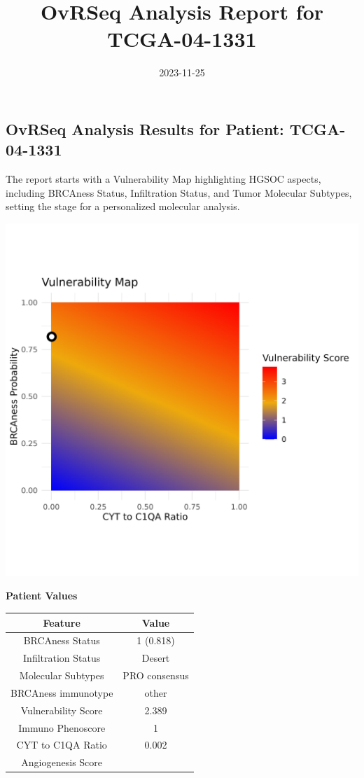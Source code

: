 \documentclass[
]{article}
\title{OvRSeq Analysis Report for TCGA-04-1331}
\author{}
\date{\vspace{-2.5em}2023-11-25}
\begin{document}
\maketitle

\hypertarget{ovrseq-analysis-results-for-patient-tcga-04-1331}{%
\subsection{OvRSeq Analysis Results for Patient:
TCGA-04-1331}\label{ovrseq-analysis-results-for-patient-tcga-04-1331}}

The report starts with a Vulnerability Map highlighting HGSOC aspects,
including BRCAness Status, Infiltration Status, and Tumor Molecular
Subtypes, setting the stage for a personalized molecular analysis.

\begin{multicols}{2}

\includegraphics{./p1.jpeg}

\columnbreak

\textbf{Patient Values}

\begin{tabular}{cc}
\hline
Feature & Value \\
\hline
BRCAness Status & 1 (0.818) \\
Infiltration Status & Desert \\
Molecular Subtypes & PRO consensus \\
BRCAness immunotype & other \\
Vulnerability Score & 2.389 \\
Immuno Phenoscore & 1 \\
CYT to C1QA Ratio & 0.002 \\
Angiogenesis Score &  \\
\hline
\end{tabular}

\end{multicols}
\end{document}
